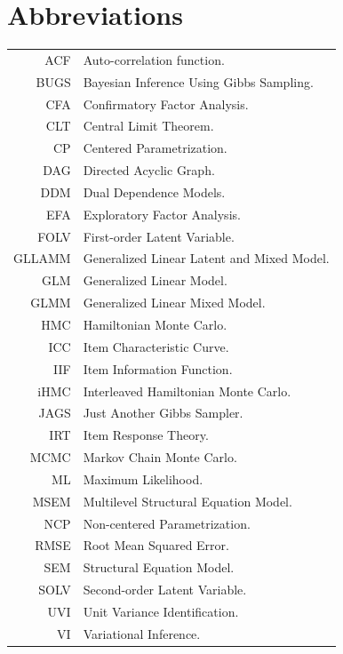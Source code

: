 \documentclass[12pt,a4paper,oneside]{book}
\begin{document}
\chapter*{Abbreviations}

\begin{tabular}{rl}
	ACF		& Auto-correlation function.\\
	BUGS	& Bayesian Inference Using Gibbs Sampling.\\
	CFA		& Confirmatory Factor Analysis. \\
	CLT		& Central Limit Theorem. \\
	CP		& Centered Parametrization.\\
	DAG		& Directed Acyclic Graph.\\
	DDM		& Dual Dependence Models.\\
	EFA		& Exploratory Factor Analysis. \\
	FOLV	& First-order Latent Variable. \\
	GLLAMM	& Generalized Linear Latent and Mixed Model. \\
	GLM		& Generalized Linear Model. \\
	GLMM	& Generalized Linear Mixed Model. \\
	HMC		& Hamiltonian Monte Carlo.\\
	ICC		& Item Characteristic Curve.\\
	IIF		& Item Information Function.\\
	iHMC	& Interleaved Hamiltonian Monte Carlo.\\
	JAGS	& Just Another Gibbs Sampler.\\
	IRT		& Item Response Theory. \\
	MCMC	& Markov Chain Monte Carlo.\\
	ML		& Maximum Likelihood.\\
	MSEM	& Multilevel Structural Equation Model.\\
	NCP		& Non-centered Parametrization.\\
	RMSE	& Root Mean Squared Error.\\
	SEM		& Structural Equation Model. \\
	SOLV	& Second-order Latent Variable.\\
	UVI		& Unit Variance Identification.\\
	VI		& Variational Inference.
	
\end{tabular}
%
%
\end{document}
